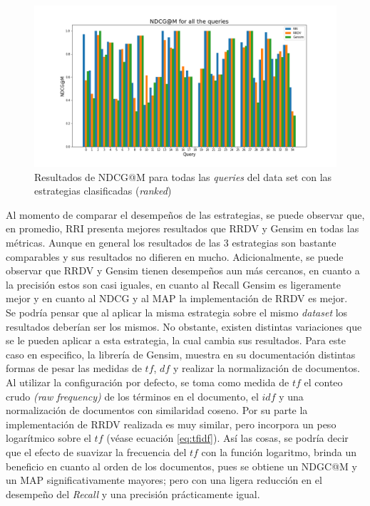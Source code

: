 \begin{figure}[H]
    \centering
    \includegraphics[width=\textwidth]{doc/images/NDCG@M_Ranked.png}
    \caption{Resultados de NDCG@M para todas las \textit{queries} del data set con las estrategias clasificadas (\textit{ranked})}
    \label{fig:rankedNDCG}
\end{figure}

Al momento de comparar el desempeños de las estrategias, se puede observar que, en promedio, RRI presenta mejores resultados que RRDV y Gensim en todas las métricas. Aunque en general los resultados de las 3 estrategias son bastante comparables y sus resultados no difieren en mucho. Adicionalmente, se puede observar que RRDV y Gensim tienen desempeños aun más cercanos, en cuanto a la precisión estos son casi iguales, en cuanto al Recall Gensim es ligeramente mejor y en cuanto al NDCG y al MAP la implementación de RRDV es mejor. \\

Se podría pensar que al aplicar la misma estrategia sobre el mismo \textit{dataset} los resultados deberían ser los mismos. No obstante, existen distintas variaciones que se le pueden aplicar a esta estrategia, la cual cambia sus resultados. Para este caso en especifico, la librería de Gensim, muestra en su documentación distintas formas de pesar las medidas de $tf$, $df$ y realizar la normalización de documentos. Al utilizar la configuración por defecto, se toma como medida de $tf$ el conteo crudo \textit{(raw frequency)} de los términos en el documento, el $idf$ y una normalización de documentos con similaridad coseno. Por su parte la implementación de RRDV realizada es muy similar, pero incorpora un peso logarítmico sobre el $tf$ (véase ecuación \ref{eq:tfidf}). Así las cosas, se podría decir que el efecto de suavizar la frecuencia del $tf$ con la función logaritmo, brinda un beneficio en cuanto al orden de los documentos, pues se obtiene un NDGC@M y un MAP significativamente mayores; pero con una ligera reducción en el desempeño del \textit{Recall} y una precisión prácticamente igual.

